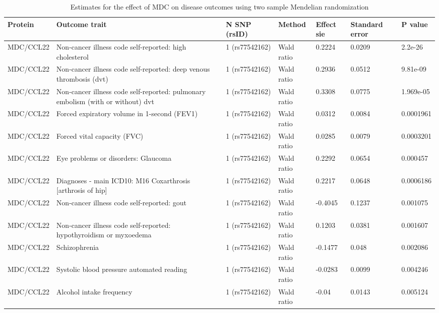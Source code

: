 \documentclass[11pt,twoside]{bristolthesis}
\begin{document}
\begin{landscape}\begin{table}

\caption{\label{tab:MDC-disease-MR}Estimates for the effect of MDC on disease outcomes using two sample Mendelian randomization}
\centering
\fontsize{9}{11}\selectfont
\begin{tabu} to 
\toprule
Protein & Outcome trait & N SNP (rsID) & Method & Effect sie & Standard error & P value\\
\midrule
MDC/CCL22 & Non-cancer illness code self-reported: high cholesterol & 1 (rs77542162) & Wald ratio & 0.2224 & 0.0209 & 2.2e-26\\
MDC/CCL22 & Non-cancer illness code self-reported: deep venous thrombosis (dvt) & 1 (rs77542162) & Wald ratio & 0.2936 & 0.0512 & 9.81e-09\\
MDC/CCL22 & Non-cancer illness code self-reported: pulmonary embolism (with or without) dvt & 1 (rs77542162) & Wald ratio & 0.3308 & 0.0775 & 1.969e-05\\
MDC/CCL22 & Forced expiratory volume in 1-second (FEV1) & 1 (rs77542162) & Wald ratio & 0.0312 & 0.0084 & 0.0001961\\
MDC/CCL22 & Forced vital capacity (FVC) & 1 (rs77542162) & Wald ratio & 0.0285 & 0.0079 & 0.0003201\\
\addlinespace
MDC/CCL22 & Eye problems or disorders: Glaucoma & 1 (rs77542162) & Wald ratio & 0.2292 & 0.0654 & 0.000457\\
MDC/CCL22 & Diagnoses - main ICD10: M16 Coxarthrosis [arthrosis of hip] & 1 (rs77542162) & Wald ratio & 0.2217 & 0.0648 & 0.0006186\\
MDC/CCL22 & Non-cancer illness code self-reported: gout & 1 (rs77542162) & Wald ratio & -0.4045 & 0.1237 & 0.001075\\
MDC/CCL22 & Non-cancer illness code self-reported: hypothyroidism or myxoedema & 1 (rs77542162) & Wald ratio & 0.1203 & 0.0381 & 0.001607\\
MDC/CCL22 & Schizophrenia & 1 (rs77542162) & Wald ratio & -0.1477 & 0.048 & 0.002086\\
\addlinespace
MDC/CCL22 & Systolic blood pressure automated reading & 1 (rs77542162) & Wald ratio & -0.0283 & 0.0099 & 0.004246\\
MDC/CCL22 & Alcohol intake frequency & 1 (rs77542162) & Wald ratio & -0.04 & 0.0143 & 0.005124\\

\end{tabu}
\end{table}
\end{landscape}
\end{document}
